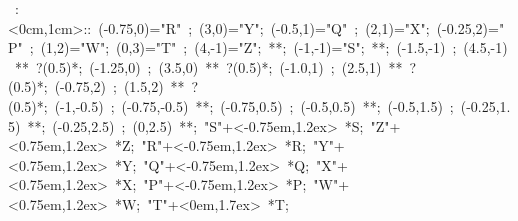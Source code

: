 

\hbox{
\xy    <1cm,0cm>:<0cm,1cm>::
       (-0.75,0)="R" ; (3,0)="Y"; 
       (-0.5,1)="Q" ; (2,1)="X"; 
       (-0.25,2)="P" ; (1,2)="W"; 
       (0,3)="T" ; (4,-1)="Z"; **\dir{-}; (-1,-1)="S"; **\dir{-}; 
       (-1.5,-1) ; (4.5,-1) **\dir{-}  ?(0.5)*\dir{>}; 
       (-1.25,0) ; (3.5,0) **\dir{-}  ?(0.5)*\dir{>}; 
       (-1.0,1) ; (2.5,1) **\dir{-}  ?(0.5)*\dir{>}; 
       (-0.75,2) ; (1.5,2) **\dir{-}  ?(0.5)*\dir{>}; 
       (-1,-0.5) ; (-0.75,-0.5) **\dir{-}; 
       (-0.75,0.5) ; (-0.5,0.5) **\dir{-}; 
       (-0.5,1.5) ; (-0.25,1.5) **\dir{-}; 
       (-0.25,2.5) ; (0,2.5) **\dir{-}; 
       "S"+<-0.75em,1.2ex> *{S};   "Z"+<0.75em,1.2ex> *{Z};   
       "R"+<-0.75em,1.2ex> *{R};   "Y"+<0.75em,1.2ex> *{Y};   
       "Q"+<-0.75em,1.2ex> *{Q};   "X"+<0.75em,1.2ex> *{X};   
       "P"+<-0.75em,1.2ex> *{P};   "W"+<0.75em,1.2ex> *{W};   
       "T"+<0em,1.7ex> *{T};
       \endxy}
	   
